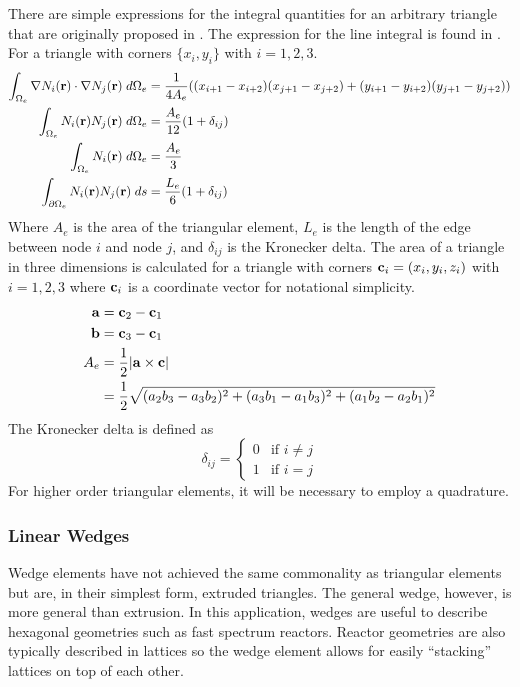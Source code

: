       There are simple expressions
      for the integral quantities for an arbitrary triangle that are originally
      proposed in \cite{textbookwhite}. The expression for
      the line integral is found in \cite{computerLab}. For a triangle with 
      corners $\{ x_i,y_i \}$ with $i=1,2,3$.
      \begin{align}
        \int_{\Omega_e} \mathbf{\nabla} N_i(\mathbf{r}) \cdot \mathbf{\nabla} N_j(\mathbf{r}) 
          \;d\Omega_e &= \frac{1}{4 A_e}
          ((x_{i+1}-x_{i+2})(x_{j+1}-x_{j+2}) + 
          (y_{i+1}-y_{i+2})(y_{j+1}-y_{j+2})) \\
        \int_{\Omega_e} N_i(\mathbf{r}) N_j(\mathbf{r}) \;d\Omega_e &= 
          \frac{A_e}{12} (1+\delta_{ij}) \\
        \int_{\Omega_e} N_i(\mathbf{r}) \;d\Omega_e &= \frac{A_e}{3} \\
        \int_{\partial \Omega_e} N_i(\mathbf{r}) N_j(\mathbf{r}) \;ds &=
          \frac{L_e}{6}(1+\delta_{ij}) \\
      \end{align}
      Where $A_e$ is the area of the triangular element, $L_e$ is the length of 
      the edge between node $i$ and node $j$, and $\delta_{ij}$ is the Kronecker
      delta. The area of a triangle in three dimensions is calculated for a
      triangle with corners $\mathbf{c}_i = (x_i, y_i, z_i)$ with $i=1,2,3$ where
      $\mathbf{c}_i$ is a coordinate vector for notational simplicity.
      \begin{align}
        \mathbf{a} &= \mathbf{c}_2 - \mathbf{c}_1 \\
        \mathbf{b} &= \mathbf{c}_3 - \mathbf{c}_1 \\
        A_e &= \frac{1}{2} \lvert \mathbf{a} \times \mathbf{c} \rvert \\
        &= \frac{1}{2} \sqrt{ (a_2 b_3 - a_3 b_2)^2 + (a_3 b_1 - a_1 b_3)^2 +
          (a_1 b_2 - a_2 b_1)^2}
      \end{align}
      The Kronecker delta is defined as
      \begin{equation} \label{eq:kroneker_delta}
        \delta_{ij} =
        \begin{cases}
          0 & \text{if } i \ne j \\
          1 & \text{if } i = j
        \end{cases}
      \end{equation}
      For higher order triangular elements, it will be necessary to employ a 
      quadrature.
    \subsubsection{Linear Wedges}
      Wedge elements have not achieved the same commonality as triangular 
      elements but are, in their simplest form, extruded triangles. The general
      wedge, however, is more general than extrusion. In this application,
      wedges are useful to describe hexagonal geometries such as fast spectrum
      reactors. Reactor geometries are also typically described in lattices so
      the wedge element allows for easily ``stacking'' lattices on top of each
      other.

